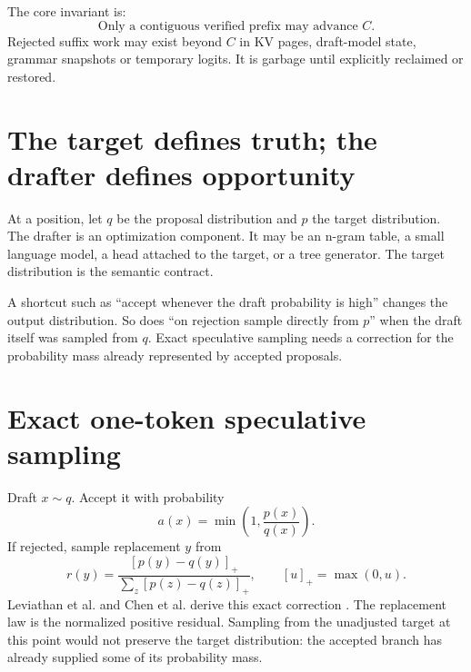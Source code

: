 The core invariant is:
\[
\boxed{\text{Only a contiguous verified prefix may advance }C.}
\]
Rejected suffix work may exist beyond $C$ in KV pages, draft-model state, grammar
snapshots or temporary logits. It is garbage until explicitly reclaimed or restored.


\section{The target defines truth; the drafter defines opportunity}

At a position, let $q$ be the proposal distribution and $p$ the target distribution.
The drafter is an optimization component. It may be an n-gram table, a small language
model, a head attached to the target, or a tree generator. The target distribution is
the semantic contract.

A shortcut such as ``accept whenever the draft probability is high'' changes the
output distribution. So does ``on rejection sample directly from $p$'' when the draft
itself was sampled from $q$. Exact speculative sampling needs a correction for the
probability mass already represented by accepted proposals.

\section{Exact one-token speculative sampling}

Draft $x\sim q$. Accept it with probability
\begin{equation}
a(x)=\min\left(1,\frac{p(x)}{q(x)}\right).
\label{eq:spec-accept}
\end{equation}
If rejected, sample replacement $y$ from
\begin{equation}
r(y)=\frac{[p(y)-q(y)]_+}{\sum_z[p(z)-q(z)]_+},
\qquad [u]_+=\max(0,u).
\label{eq:spec-residual}
\end{equation}
Leviathan et al. and Chen et al. derive this exact correction
\cite{leviathan2023speculative,chen2023speculative}.
The replacement law is the normalized positive residual. Sampling from the
unadjusted target at this point would not preserve the target distribution:
the accepted branch has already supplied some of its probability mass.

